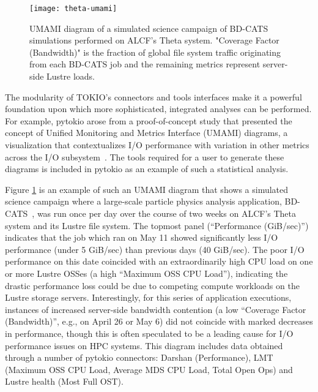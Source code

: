 \begin{figure}[t]
    \centering
    \texttt{[image: theta-umami]}
    \vspace{-.3in}
    \caption{UMAMI diagram of a simulated science campaign of BD-CATS~\cite{patwary2015bd} simulations performed on ALCF's Theta system.  
    "Coverage Factor (Bandwidth)" is the fraction of global file system traffic originating from each BD-CATS job and the remaining metrics represent server-side Lustre loads.}
    \label{fig:umami}
    \vspace{-.2in}
\end{figure}

The modularity of TOKIO's connectors and tools interfaces make it a powerful foundation upon which more sophisticated, integrated analyses can be performed.
For example, pytokio arose from a proof-of-concept study that presented the concept of Unified Monitoring and Metrics Interface (UMAMI) diagrams, a visualization that contextualizes I/O performance with variation in other metrics across the I/O subsystem~\cite{Lockwood2017}.
The tools required for a user to generate these diagrams is included in pytokio as an example of such a statistical analysis.

Figure \ref{fig:umami} is an example of such an UMAMI diagram that shows a simulated science campaign where a large-scale particle physics analysis application, BD-CATS~\cite{patwary2015bd}, was run once per day over the course of two weeks on ALCF's Theta system and its Lustre file system.
The topmost panel (``Performance (GiB/sec)'') indicates that the job which ran on May 11 showed significantly less I/O performance (under 5 GiB/sec) than previous days (40 GiB/sec).
The poor I/O performance on this date coincided with an extraordinarily high CPU load on one or more Lustre OSSes (a high ``Maximum OSS CPU Load''), indicating the drastic performance loss could be due to competing compute workloads on the Lustre storage servers. Interestingly, for this series of application executions, instances of increased server-side bandwidth contention 
(a low ``Coverage Factor (Bandwidth)'', e.g., on April 26 or May 6) did not coincide with marked decreases in performance, though this is often speculated to be a leading cause for I/O performance issues on HPC systems.
This diagram includes data obtained through a number of pytokio connectors: Darshan (Performance), LMT (Maximum OSS CPU Load, Average MDS CPU Load, Total Open Ops) and Lustre health (Most Full OST).

